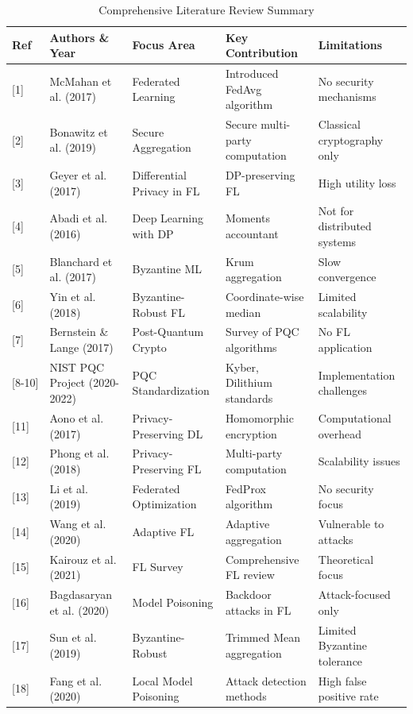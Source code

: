 \documentclass[12pt,a4paper]{article}
\begin{document}
\begin{table}[H]
\centering
\caption{Comprehensive Literature Review Summary}
\scriptsize
\begin{tabular}{p{0.8cm}p{3.5cm}p{2.5cm}p{2cm}p{3cm}}
\toprule
\textbf{Ref} & \textbf{Authors \& Year} & \textbf{Focus Area} & \textbf{Key Contribution} & \textbf{Limitations} \\
\midrule
{[}1{]} & McMahan et al. (2017) & Federated Learning & Introduced FedAvg algorithm & No security mechanisms \\
{[}2{]} & Bonawitz et al. (2019) & Secure Aggregation & Secure multi-party computation & Classical cryptography only \\
{[}3{]} & Geyer et al. (2017) & Differential Privacy in FL & DP-preserving FL & High utility loss \\
{[}4{]} & Abadi et al. (2016) & Deep Learning with DP & Moments accountant & Not for distributed systems \\
{[}5{]} & Blanchard et al. (2017) & Byzantine ML & Krum aggregation & Slow convergence \\
{[}6{]} & Yin et al. (2018) & Byzantine-Robust FL & Coordinate-wise median & Limited scalability \\
{[}7{]} & Bernstein \& Lange (2017) & Post-Quantum Crypto & Survey of PQC algorithms & No FL application \\
{[}8{-}10{]} & NIST PQC Project (2020-2022) & PQC Standardization & Kyber, Dilithium standards & Implementation challenges \\
{[}11{]} & Aono et al. (2017) & Privacy-Preserving DL & Homomorphic encryption & Computational overhead \\
{[}12{]} & Phong et al. (2018) & Privacy-Preserving FL & Multi-party computation & Scalability issues \\
{[}13{]} & Li et al. (2019) & Federated Optimization & FedProx algorithm & No security focus \\
{[}14{]} & Wang et al. (2020) & Adaptive FL & Adaptive aggregation & Vulnerable to attacks \\
{[}15{]} & Kairouz et al. (2021) & FL Survey & Comprehensive FL review & Theoretical focus \\
{[}16{]} & Bagdasaryan et al. (2020) & Model Poisoning & Backdoor attacks in FL & Attack-focused only \\
{[}17{]} & Sun et al. (2019) & Byzantine-Robust & Trimmed Mean aggregation & Limited Byzantine tolerance \\
{[}18{]} & Fang et al. (2020) & Local Model Poisoning & Attack detection methods & High false positive rate \\

\end{tabular}
\end{table}
\end{document}
